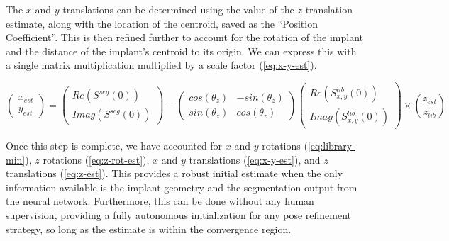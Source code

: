 The $x$ and $y$ translations can be determined using the value of the $z$ translation estimate, along with the location of the centroid, saved as the ``Position Coefficient''. This is then refined further to account for the rotation of the implant and the distance of the implant's centroid to its origin. We can express this with a single matrix multiplication multiplied by a scale factor (\cref{eq:x-y-est}).

\begin{equation}
    \begin{pmatrix}
        x_{est} \\ y_{est}
    \end{pmatrix} = \begin{pmatrix}
        Re(S^{seg}(0)) \\ Imag(S^{seg}(0))
    \end{pmatrix} - \begin{pmatrix}
        cos(\theta_z) & -sin(\theta_z) \\ sin(\theta_z) & cos(\theta_z)
    \end{pmatrix}\begin{pmatrix}
        Re(S^{lib}_{x,y}(0)) \\ Imag(S^{lib}_{x,y}(0))
    \end{pmatrix} \times (\frac{z_{est}}{z_{lib}})
    \label{eq:x-y-est}
\end{equation}

Once this step is complete, we have accounted for $x$ and $y$ rotations (\cref{eq:library-min}), $z$ rotations (\cref{eq:z-rot-est}), $x$ and $y$ translations (\cref{eq:x-y-est}), and $z$ translations (\cref{eq:z-est}). This provides a robust initial estimate when the only information available is the implant geometry and the segmentation output from the neural network. Furthermore, this can be done without any human supervision, providing a fully autonomous initialization for any pose refinement strategy, so long as the estimate is within the convergence region.